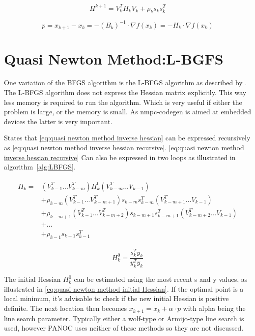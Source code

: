 		\begin{equation}
			H^{k+1} = V_k^TH_kV_k + \rho_ks_ks_k^T
			\label{eq:quasi newton method inverse hessian}	
		\end{equation}
		
		\begin{equation}
		p = x_{k+1}-x_k = -(B_k)^{-1} \cdot \nabla f(x_k) = -H_k\cdot \nabla f(x_k)
		\label{eq:quasi newton method}	
		\end{equation}
		
	\section{Quasi Newton Method:L-BGFS}
	One variation of the BFGS algorithm is the L-BFGS algorithm as described by \cite{Wright}. The L-BFGS algorithm does not express the Hessian matrix explicitly. This way less memory is required to run the algorithm. Which is very useful if either the problem is large, or the memory is small. As nmpc-codegen is aimed at embedded devices the latter is very important.
	
	\cite{Wright} States that \eqref{eq:quasi newton method inverse hessian} can be expressed recursively as \eqref{eq:quasi newton method inverse hessian recursive}. \eqref{eq:quasi newton method inverse hessian recursive} Can also be expressed in two loops as illustrated in algorithm~\ref{alg:LBFGS}.
	
		\begin{eqnarray}	 
			\begin{aligned}
				H_k = 
				& (V^T_{k-1} ... V^T_{k-m})H^0_k(V^T_{k-m} ... V_{k-1}) \\
				& + \rho_{k-m} (V^T_{k-1} ... V^T_{k-m+1})s_{k-m}s_{k-m}^T(V^T_{k-m+1} ... V_{k-1}) \\
				& + \rho_{k-m+1} (V^T_{k-1} ... V^T_{k-m+2})s_{k-m+1}s_{k-m+1}^T(V^T_{k-m+2} ... V_{k-1}) \\
				& + ... \\
				& + \rho_{k-1}s_{k-1}s_{k-1}^T
			\end{aligned}
			\label{eq:quasi newton method inverse hessian recursive}
		\end{eqnarray}
		
		\begin{equation}
			H_k^0 = \frac{s_k^Ty_k}{y_k^Ty_k}
			\label{eq:quasi newton method initial Hessian}
		\end{equation}
		
	The initial Hessian $H^0_k$ can be estimated using the most recent s and y values, as illustrated in \eqref{eq:quasi newton method initial Hessian}. If the optimal point is a local minimum, it's advisable to check if the new initial Hessian is positive definite. The next location then becomes $x_{k+1} = x_{k}+ \alpha \cdot p$ with alpha being the line search parameter. Typically either a wolf-type or Armijo-type line search is used, however PANOC uses neither of these methods so they are not discussed.
	
